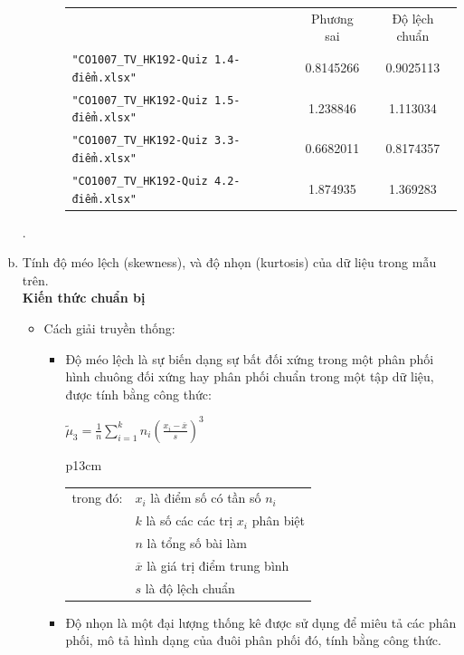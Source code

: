 \documentclass[a4paper]{article}
\theoremstyle{definition}
\begin{document}
\begin{enumerate}[a)]
\begin{itemize}
\begin{itemize}
\begin{center}
\begin{tabular}{l c c}
                     & Phương sai & Độ lệch chuẩn\\
                     \texttt{"CO1007\_TV\_HK192-Quiz 1.4-điểm.xlsx"} & 0.8145266 & 0.9025113\\
                     \texttt{"CO1007\_TV\_HK192-Quiz 1.5-điểm.xlsx"} & 1.238846 & 1.113034\\
                     \texttt{"CO1007\_TV\_HK192-Quiz 3.3-điểm.xlsx"} & 0.6682011 & 0.8174357\\
                     \texttt{"CO1007\_TV\_HK192-Quiz 4.2-điểm.xlsx"} & 1.874935 & 1.369283
                \end{tabular}
            \end{center}
        \end{itemize}
    \end{itemize}.
    \bf\item Tính độ méo lệch (skewness), và độ nhọn (kurtosis) của dữ liệu trong mẫu trên.\\[6pt]
    \bf Kiến thức chuẩn bị\normalfont
    \begin{itemize}
        \item Cách giải truyền thống:
        \begin{itemize}
            \item Độ méo lệch là sự biến dạng sự bất đối xứng trong một phân phối hình chuông đối xứng hay phân phối chuẩn trong một tập dữ liệu, được tính bằng công thức:
            \begin{center}
                $\tilde{\mu}_3 = \frac{1}{n} \sum \limits_{i=1}^{k} n_i (\frac{x_i - \overline{x}}{s})^3$
                \begin{tabular}{p{13cm}}
                    \begin{tabular}{l l}
                        trong đó: & $x_i$ là điểm số có tần số $n_i$\\
                        & $k$ là số các các trị $x_i$ phân biệt\\
                        & $n$ là tổng số bài làm\\
                        & $\overline{x}$ là giá trị điểm trung bình\\
                        & $s$ là độ lệch chuẩn
                    \end{tabular}
                \end{tabular}
            \end{center}
            \item Độ nhọn là một đại lượng thống kê được sử dụng để miêu tả các phân phối, mô tả hình dạng của đuôi phân phối đó, tính bằng công thức.

\end{itemize}
\end{itemize}
\end{enumerate}
\end{document}
